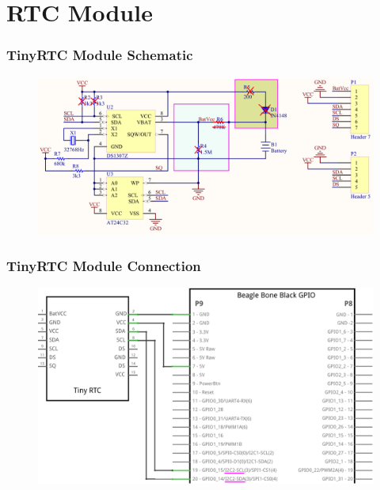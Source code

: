 \documentclass[aspectratio=169,usenames,dvipsnames]{beamer}
\begin{document}

\section{RTC Module}

\begin{frame}
  \frametitle{TinyRTC Module Schematic}
  \begin{figure}
    \centering
    \includegraphics[scale=0.15]{images/tinyrtc-scheme-mod.png}
  \end{figure}
  \vspace*{-12mm}
\end{frame}

\begin{frame}
  \frametitle{TinyRTC Module Connection}
  \begin{figure}
    \centering
    \includegraphics[scale=1]{images/bbb-rtc_schem.png}
  \end{figure}
  \vspace*{-12mm}
\end{frame}
\end{document}
